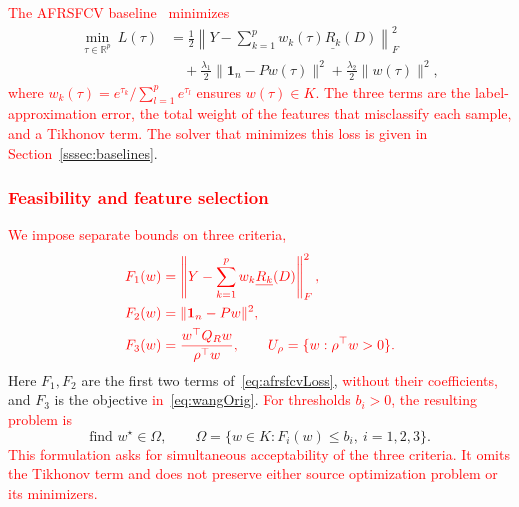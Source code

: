 \documentclass[]{interact}
\theoremstyle{plain}
\theoremstyle{definition}
\theoremstyle{remark}
\newcommand{\R}{\mathbb{R}}
\begin{document}
\leavevmode\textcolor{red}{The AFRSFCV baseline~\citep{wang2026afrsfcv} minimizes}
\begin{equation}\label{eq:afrsfcvLoss}
\begin{split}
\min_{\tau\in\R^p}\ L(\tau)
&=\frac12\left\|Y-\sum_{k=1}^{p}w_k(\tau)\underline{R_k}(D)\right\|_F^2\\
&\quad+\frac{\lambda_1}{2}\|\mathbf1_n-Pw(\tau)\|^2+\frac{\lambda_2}{2}\|w(\tau)\|^2,
\end{split}
\end{equation}
\leavevmode\textcolor{red}{where $w_k(\tau)=e^{\tau_k}/\sum_{l=1}^{p}e^{\tau_l}$ ensures $w(\tau)\in K$. The three terms are the label-approximation error, the total weight of the features that misclassify each sample, and a Tikhonov term.
The solver that minimizes this loss is given in Section~\ref{sssec:baselines}}.

\subsubsection{\textcolor{red}{Feasibility and feature selection}}\label{ssec:reduction}\label{ssec:selection}
\leavevmode\textcolor{red}{We impose separate bounds on three criteria,}
\begin{align}\color{red}
F_1(w)&\color{red}=\left\|Y-\sum_{k=1}^{p}w_k\underline{R_k}(D)\right\|_F^2,\label{eq:fsF1}\\\color{red}
F_2(w)&\color{red}=\|\mathbf1_n-Pw\|^2,\label{eq:fsF2}\\\color{red}
F_3(w)&\color{red}=\frac{w^{\top}Q_Rw}{\rho^{\top}w},\qquad U_\rho=\{w:\rho^{\top}w>0\}.\label{eq:fsF3}
\end{align}
Here $F_1,F_2$ are the first two terms of~\eqref{eq:afrsfcvLoss}, \leavevmode\textcolor{red}{without their coefficients,} and $F_3$ is the objective \leavevmode\textcolor{red}{in}~\eqref{eq:wangOrig}. \leavevmode\textcolor{red}{For thresholds $b_i>0$, the resulting problem is}
\begin{equation}\label{eq:nsfp-fs}
\text{find }w^\star\in\Omega,\qquad \Omega=\{w\in K:F_i(w)\le b_i,\ i=1,2,3\}.
\end{equation}
\leavevmode\textcolor{red}{This formulation asks for simultaneous acceptability of the three criteria. It omits the Tikhonov term and does not preserve either source optimization problem or its minimizers.}
\end{document}
